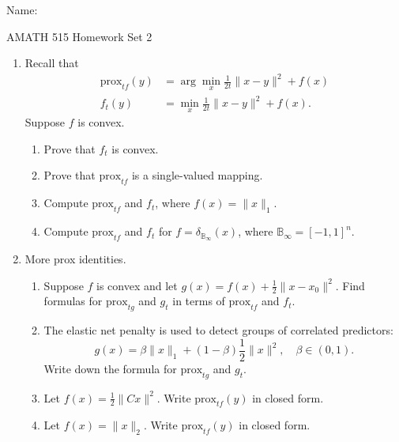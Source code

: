 \documentclass[11pt]{amsart}
\newcommand{\prox}{\mathrm{prox}}
\begin{document}
{\Large Name:}  \\
\begin{center}
\Large AMATH 515 \hskip 2in Homework Set 2\\
\end{center}
\vskip 32pt

\begin{enumerate}



\item Recall that 
\[
\begin{aligned}
\mbox{prox}_{t f}(y) &= \arg\min_{x} \frac{1}{2t}\|x-y\|^2 + f(x)\\
f_t(y) &= \min_x \frac{1}{2t}\|x-y\|^2 + f(x).
\end{aligned}
\] 
Suppose $f$ is convex. 
\vskip 16pt
\begin{enumerate}

\item Prove that $f_t$ is convex.  
\bigskip

\item Prove that $\prox_{t f}$ is a single-valued mapping. 
\bigskip

\item Compute $\prox_{t f}$ and $f_t$, where $f(x) = \|x\|_1$. 
\bigskip
\item Compute $\prox_{t f}$ and $f_t$ for $f = \delta_{\mathbb{B}_{\infty}}(x)$, 
where $\mathbb{B}_\infty = [-1,1]^n$.

\bigskip
\end{enumerate}

\vskip 32pt

\item More prox identities. 
\vskip 16pt
\begin{enumerate}

\item Suppose $f$ is convex and let $g(x) = f(x) + \frac{1}{2}\|x-x_0\|^2$. 
Find formulas for $\prox_{t g}$ and $g_t$ in terms of $\prox_{t f}$ and $f_t$.
\bigskip

\item The elastic net penalty is used to detect groups of correlated predictors:
\[
g(x) = \beta \|x\|_1 + (1-\beta) \frac{1}{2}\|x\|^2, \quad \beta \in (0,1).
\] 
Write down the formula for $\prox_{t g}$ and $g_t$.
\bigskip

\item Let $f(x) = \frac{1}{2}\|Cx\|^2$. Write $\prox_{t f}(y)$ in closed form.

\bigskip

\item Let $f(x) = \|x\|_2$. Write $\prox_{tf}(y)$ in closed form.

\end{enumerate}
\end{enumerate}
\end{document}
